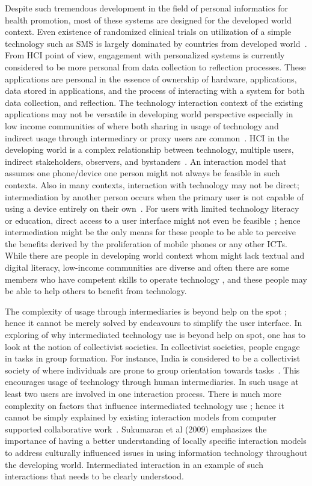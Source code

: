 Despite such tremendous development in the field of personal informatics for health promotion, most of these systems are designed for the developed world context. Even existence of randomized clinical trials on utilization of a simple technology such as SMS is largely dominated by countries from developed world~\citep{cole2010text}. From HCI point of view, engagement with personalized systems is currently considered to be more personal from data collection to reflection processes. These applications are personal in the essence of ownership of hardware, applications, data stored in applications, and the process of interacting with a system for both data collection, and reflection. The technology interaction context of the existing applications may not be versatile in developing world perspective especially in low income communities of where  both sharing in usage of technology and indirect usage through intermediary or proxy users are common~\citep{kaplan2006can,sambasivan2010}. HCI in the developing world is a complex relationship between technology, multiple users, indirect stakeholders, observers, and bystanders~\citep{parikh2006}. An interaction model that assumes one phone/device one person might not always be feasible in such contexts. Also in many contexts, interaction with technology may not be direct; intermediation by another person occurs when the primary user is not capable of using a device entirely on their own~\citep{sambasivan2010}. For users with limited technology literacy or education, direct access to a user interface might not even be feasible~\citep{parikh2006}; hence intermediation might be the only means for these people to be able to perceive the benefits derived by the proliferation of mobile phones or any other ICTs. While there are people in developing world context whom might lack textual and digital literacy, low-income communities are diverse and often there are some members who have competent skills to operate technology \citep{sambasivan2010}, and these people may be able to help others to benefit from technology.

The complexity of usage through intermediaries is beyond help on the spot \citep{sambasivan2010}; hence it cannot be merely solved by endeavours to simplify the user interface. In exploring of why intermediated technology use is beyond help on spot, one has to look at the notion of collectivist societies. In collectivist societies, people engage in tasks in group formation. For instance, India is considered to be a collectivist society of where individuals are prone to group orientation towards tasks~\citep{parikh2006}. This encourages usage of technology through human intermediaries. In such usage at least two users are involved in one interaction process. There is much more complexity on factors that influence intermediated technology use ; hence it cannot be simply explained by existing interaction models from computer supported collaborative work~\citep{parikh2006}. Sukumaran et al (2009) emphasizes the importance of having a better understanding of locally specific interaction models to address culturally influenced issues in using information technology throughout the developing world. Intermediated interaction in an example of such interactions that needs to be clearly understood.

